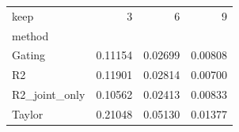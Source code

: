 \begin{tabular}{lrrr}
\toprule
keep & 3 & 6 & 9 \\
method &  &  &  \\
\midrule
Gating & 0.11154 & 0.02699 & 0.00808 \\
R2 & 0.11901 & 0.02814 & 0.00700 \\
R2_joint_only & 0.10562 & 0.02413 & 0.00833 \\
Taylor & 0.21048 & 0.05130 & 0.01377 \\
\bottomrule
\end{tabular}
